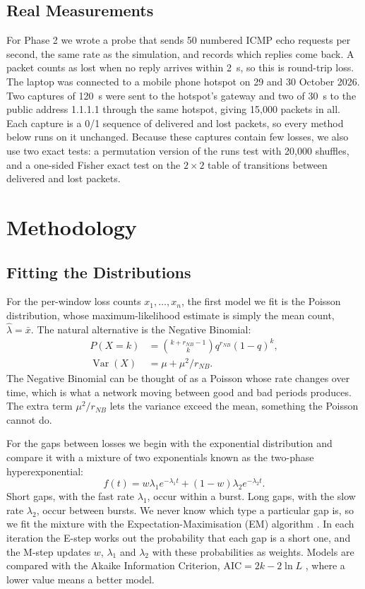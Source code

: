 \documentclass[conference]{IEEEtran}
\begin{document}
\subsection{Real Measurements}
For Phase 2 we wrote a probe that sends 50 numbered ICMP echo requests per second, the same rate as the simulation, and records which replies come back. A packet counts as lost when no reply arrives within 2~s, so this is round-trip loss. The laptop was connected to a mobile phone hotspot on 29 and 30 October 2026. Two captures of 120~s were sent to the hotspot's gateway and two of 30~s to the public address 1.1.1.1 through the same hotspot, giving 15{,}000 packets in all. Each capture is a 0/1 sequence of delivered and lost packets, so every method below runs on it unchanged. Because these captures contain few losses, we also use two exact tests: a permutation version of the runs test with 20{,}000 shuffles, and a one-sided Fisher exact test on the $2\times2$ table of transitions between delivered and lost packets.

\section{Methodology}
\subsection{Fitting the Distributions}
For the per-window loss counts $x_1,\dots,x_n$, the first model we fit is the Poisson distribution, whose maximum-likelihood estimate is simply the mean count, $\hat\lambda=\bar x$. The natural alternative is the Negative Binomial:
\begin{align}
P(X=k)&=\binom{k+r_{\!NB}-1}{k}q^{r_{\!NB}}(1-q)^k,\\
\operatorname{Var}(X)&=\mu+\mu^2/r_{\!NB} .
\end{align}
The Negative Binomial can be thought of as a Poisson whose rate changes over time, which is what a network moving between good and bad periods produces. The extra term $\mu^2/r_{\!NB}$ lets the variance exceed the mean, something the Poisson cannot do.

For the gaps between losses we begin with the exponential distribution and compare it with a mixture of two exponentials known as the two-phase hyperexponential:
\begin{equation}
f(t)=w\lambda_1e^{-\lambda_1t}+(1-w)\lambda_2e^{-\lambda_2t}.
\end{equation}
Short gaps, with the fast rate $\lambda_1$, occur within a burst. Long gaps, with the slow rate $\lambda_2$, occur between bursts. We never know which type a particular gap is, so we fit the mixture with the Expectation-Maximisation (EM) algorithm \cite{dempster1977}. In each iteration the E-step works out the probability that each gap is a short one, and the M-step updates $w$, $\lambda_1$ and $\lambda_2$ with these probabilities as weights. Models are compared with the Akaike Information Criterion, $\text{AIC}=2k-2\ln L$ \cite{akaike1974}, where a lower value means a better model.
\end{document}
